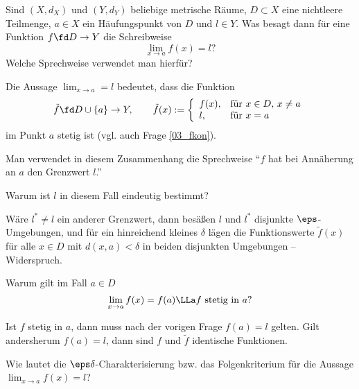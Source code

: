 \begin{frage}
  Sind $(X,d_X)$ und $(Y,d_Y)$ beliebige metrische Räume, 
  $D\subset X$ eine nichtleere Teilmenge, $a\in X$ ein 
  Häufungspunkt von $D$ und $l\in Y$. 
  Was besagt dann für eine Funktion 
  $f\fd D \to Y$ die Schreibweise 
  \[
  \lim_{x\to a} f(x) = l \text{?}
  \]
  Welche Sprechweise verwendet man hierfür?
\end{frage}

\begin{antwort}
  Die Aussage $\lim_{x\to a} = l$ bedeutet, dass die 
  Funktion 
  \[
  \tilde{f} \fd D \cup \{ a \} \to Y, \qquad
  \tilde{f} (x) := \left\{ 
    \begin{array}{ll} 
      f(x),& \text{für $x\in D$, $x\not=a$} \\
      l,   & \text{für $x=a$} 
    \end{array} \right.
  \]
  im Punkt $a$ stetig ist (vgl. auch Frage \ref{03_fkon}).

  Man verwendet in diesem Zusammenhang die Sprechweise 
  "`$f$ hat bei Annäherung an 
  $a$ den Grenzwert $l$."' 
  \AntEnd
\end{antwort}


\begin{frage}
  Warum ist $l$ in diesem Fall eindeutig bestimmt?
\end{frage}

\begin{antwort}
  Wäre $l^*\not=l$ ein anderer Grenzwert, dann besäßen $l$ und $l^*$ disjunkte 
  $\eps$-Umgebungen, und für ein hinreichend kleines $\delta$ lägen die 
  Funktionswerte $\tilde{f}(x)$ für alle $x\in D$ mit $d(x,a) < \delta$ 
  in beiden disjunkten Umgebungen -- Widerspruch.
  \AntEnd 
\end{antwort}



\begin{frage}
  Warum gilt im Fall $a\in D$ 
  \[
  \lim_{x\to a} f(x)=f(a) \LLa 
  \text{$f$ stetig in $a$?}
  \]
\end{frage}

\begin{antwort} 
  Ist $f$ stetig in $a$, dann muss nach der vorigen Frage $f(a)=l$ 
  gelten. Gilt andersherum $f(a)=l$, dann sind $f$ und $\tilde{f}$ 
  identische Funktionen.
  \AntEnd
\end{antwort}

\begin{frage}
  Wie lautet die $\eps\delta$-Charakterisierung 
  bzw. das Folgenkriterium für die Aussage $\lim_{x\to a} f(x)=l$? 
\end{frage} 

